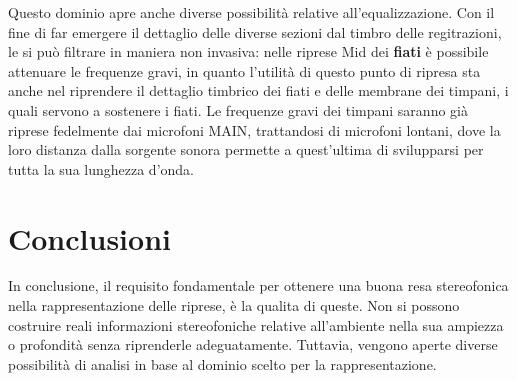 	Questo dominio apre anche diverse possibilità relative all'equalizzazione.
	Con il fine di far emergere il dettaglio delle diverse sezioni dal timbro delle regitrazioni, le si può filtrare in maniera non invasiva: nelle riprese Mid dei \textbf{fiati} è possibile attenuare le frequenze gravi, in quanto l'utilità di questo punto di ripresa sta anche nel riprendere il dettaglio timbrico dei fiati e delle membrane dei timpani, i quali servono a sostenere i fiati. Le frequenze gravi dei timpani saranno già riprese fedelmente dai microfoni MAIN, trattandosi di microfoni lontani, dove la loro distanza dalla sorgente sonora permette a quest'ultima di svilupparsi per tutta la sua lunghezza d'onda.
	
	\section*{Conclusioni}
	In conclusione, il requisito fondamentale per ottenere una buona resa stereofonica nella rappresentazione delle riprese, è la qualita di queste. Non si possono costruire reali informazioni stereofoniche relative all'ambiente nella sua ampiezza o profondità senza riprenderle adeguatamente.
	Tuttavia, vengono aperte diverse possibilità di analisi in base al dominio scelto per la rappresentazione.
	
	
	\vfill\null
	
	\newpage %
	
	
	\vfill\null
	
	\raggedright
	


